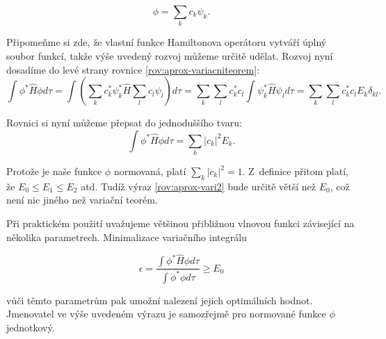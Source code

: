 \begin{equation}
\phi=\sum_k c_k \psi_k. 
\label{rov:aprox-rozvojbaze}
\end{equation}

\noindent Připomeňme si zde, že vlastní funkce Hamiltonova operátoru vytváří úplný soubor funkcí, takže výše uvedený rozvoj můžeme určitě udělat. Rozvoj nyní dosadíme do levé strany rovnice \ref{rov:aprox-variacniteorem}: 
\begin{equation}
\int\phi^*\hat{H}\phi d\tau=\int\left( \sum_k c_k^* \psi_k^*\hat{H}\sum_l c_l\psi_l\right)d\tau =\sum_k \sum_l c_k^*c_l\int\psi_k^*\hat{H}\psi_l d\tau=\sum_k \sum_l c_k^*c_lE_k\delta_{kl}.
\end{equation}

\noindent Rovnici si nyní můžeme přepsat do jednoduššího tvaru:
\begin{equation}
\int\phi^*\hat{H}\phi d\tau=\sum_k |c_k|^2E_k.
\label{rov:aprox-vari2}
\end{equation}

\noindent Protože je naše funkce $ \phi $ normovaná, platí $\sum_k |c_k|^2=1 $. Z~definice přitom platí, že $E_0 \leq E_1 \leq E_2$ atd. Tudíž výraz \ref{rov:aprox-vari2} bude určitě větší než $ E_0 $, což není nic jiného než variační teorém.

Při praktickém použití uvažujeme většinou  přibližnou vlnovou funkci závisející na několika parametrech. Minimalizace variačního integrálu

\begin{equation}
\epsilon=\frac{\int\phi^*\hat{H}\phi d\tau}{\int\phi^*\phi d\tau}\geq E_0
\label{rov:aprox-variacniintegrál}
\end{equation}

\noindent vůči těmto parametrům pak umožní nalezení jejich optimálních hodnot. Jmenovatel ve výše uvedeném výrazu je samozřejmě pro normované funkce $ \phi $ jednotkový.

